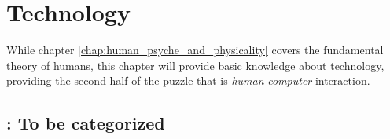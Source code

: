 \chapter{Technology} \label{chap:technology}
While chapter \ref{chap:human_psyche_and_physicality} covers the fundamental theory of humans, this chapter will provide basic knowledge about technology, providing the second half of the puzzle that is \emph{human}-\emph{computer} interaction.

\vfill \minitoc \newpage



\newpage
\section{\todo : To be categorized}
